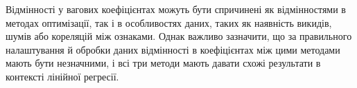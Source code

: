 \documentclass[]{article}
\begin{document}
Відмінності у вагових коефіцієнтах можуть бути спричинені як
відмінностями в методах оптимізації, так і в особливостях даних, таких
як наявність викидів, шумів або кореляцій між ознаками. Однак важливо
зазначити, що за правильного налаштування й обробки даних відмінності в
коефіцієнтах між цими методами мають бути незначними, і всі три методи
мають давати схожі результати в контексті лінійної регресії.




\end{document}
